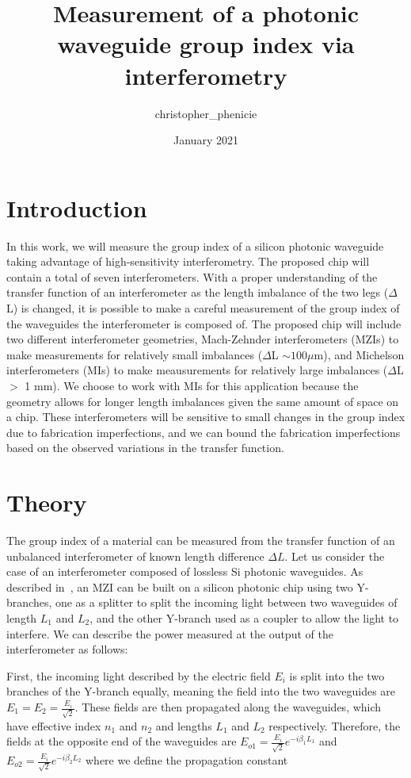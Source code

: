 \documentclass[journal]{IEEEtran}
\title{Measurement of a photonic waveguide group index via interferometry}
\date{January 2021}
\author{christopher\_phenicie}
\begin{document}
\maketitle

\section{Introduction}
\label{sec:intro}

In this work, we will measure the group index of a silicon photonic waveguide taking advantage of high-sensitivity interferometry. The proposed chip will contain a total of seven interferometers. With a proper understanding of the transfer function of an interferometer as the length imbalance of the two legs ($\Delta$L) is changed, it is possible to make a careful measurement of the group index of the waveguides the interferometer is composed of. The proposed chip will include two different interferometer geometries, Mach-Zehnder interferometers (MZIs) to make measurements for relatively small imbalances ($\Delta$L $\sim 100\mu$m), and Michelson interferometers (MIs) to make meausurements for relatively large imbalances ($\Delta$L $>$ 1 mm). We choose to work with MIs for this application because the geometry allows for longer length imbalances given the same amount of space on a chip. These interferometers will be sensitive to small changes in the group index due to fabrication imperfections, and we can bound the fabrication imperfections based on the observed variations in the transfer function.

\section{Theory}
\label{sec:theory}

The group index of a material can be measured from the transfer function of an unbalanced interferometer of known length difference $\Delta L$. Let us consider the case of an interferometer composed of lossless Si photonic waveguides. As described in~\cite{Chrostowski2015}, an MZI can be built on a silicon photonic chip using two Y-branches, one as a splitter to split the incoming light between two waveguides of length $L_1$ and $L_2$, and the other Y-branch used as a coupler to allow the light to interfere. We can describe the power measured at the output of the interferometer as follows:

First, the incoming light described by the electric field $E_i$ is split into the two branches of the Y-branch equally, meaning the field into the two waveguides are $E_1 = E_2 = \frac{E_i}{\sqrt{2}}$. These fields are then propagated along the waveguides, which have effective index $n_1$ and $n_2$ and lengths $L_1$ and $L_2$ respectively. Therefore, the fields at the opposite end of the waveguides are $E_{o1} = \frac{E_i}{\sqrt{2}} e^{-i \beta_1 L_1}$ and $E_{o2} = \frac{E_i}{\sqrt{2}} e^{-i \beta_2 L_2}$ where we define the propagation constant 
\end{document}
